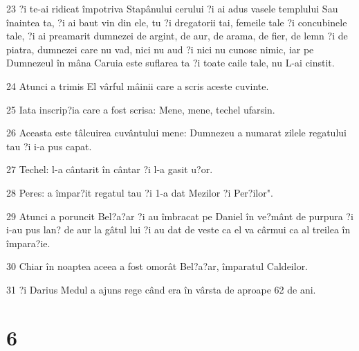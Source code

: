 \par 23 ?i te-ai ridicat împotriva Stapânului cerului ?i ai adus vasele templului Sau înaintea ta, ?i ai baut vin din ele, tu ?i dregatorii tai, femeile tale ?i concubinele tale, ?i ai preamarit dumnezei de argint, de aur, de arama, de fier, de lemn ?i de piatra, dumnezei care nu vad, nici nu aud ?i nici nu cunosc nimic, iar pe Dumnezeul în mâna Caruia este suflarea ta ?i toate caile tale, nu L-ai cinstit.
\par 24 Atunci a trimis El vârful mâinii care a scris aceste cuvinte.
\par 25 Iata inscrip?ia care a fost scrisa: Mene, mene, techel ufarsin.
\par 26 Aceasta este tâlcuirea cuvântului mene: Dumnezeu a numarat zilele regatului tau ?i i-a pus capat.
\par 27 Techel: l-a cântarit în cântar ?i l-a gasit u?or.
\par 28 Peres: a împar?it regatul tau ?i 1-a dat Mezilor ?i Per?ilor".
\par 29 Atunci a poruncit Bel?a?ar ?i au îmbracat pe Daniel în ve?mânt de purpura ?i i-au pus lan? de aur la gâtul lui ?i au dat de veste ca el va cârmui ca al treilea în împara?ie.
\par 30 Chiar în noaptea aceea a fost omorât Bel?a?ar, împaratul Caldeilor.
\par 31 ?i Darius Medul a ajuns rege când era în vârsta de aproape 62 de ani.

\chapter{6}

